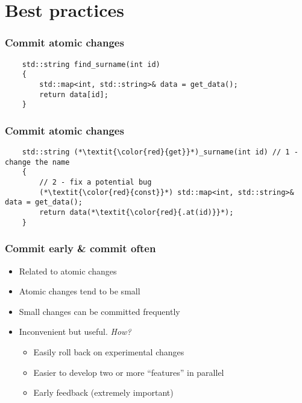 \documentclass{beamer}
\begin{document}
\begin{frame}
\end{frame}

\section{Best practices}
\begin{frame}[fragile]
  \frametitle{Commit atomic changes}
  \begin{lstlisting}
    std::string find_surname(int id)
    {
        std::map<int, std::string>& data = get_data();
        return data[id];
    }
  \end{lstlisting}
\end{frame}

\begin{frame}[fragile]
  \frametitle{Commit atomic changes}
   \begin{lstlisting}
    std::string (*\textit{\color{red}{get}}*)_surname(int id) // 1 - change the name
    {
        // 2 - fix a potential bug
        (*\textit{\color{red}{const}}*) std::map<int, std::string>& data = get_data();
        return data(*\textit{\color{red}{.at(id)}}*);
    }
  \end{lstlisting}
\end{frame}

\begin{frame}
  \frametitle{Commit early \& commit often}
  \begin{itemize}
  \item<1-> Related to atomic changes
  \item<2-> Atomic changes tend to be small
  \item<3-> Small changes can be committed frequently
  \item<4-> Inconvenient but useful. \textit{How?}
    \begin{itemize}
    \item<5-> Easily roll back on experimental changes
    \item<6-> Easier to develop two or more ``features'' in parallel
    \item<7-> Early feedback (extremely important)
    \end{itemize}
  \end{itemize}
\end{frame}
\end{document}
